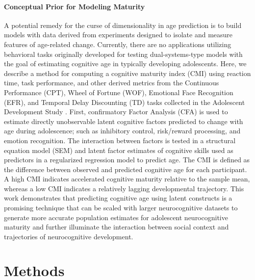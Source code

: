 \documentclass{article}%
\begin{document}
\paragraph*{Conceptual Prior for Modeling Maturity} A potential remedy for the curse of dimensionality in age prediction is to build models with data derived from experiments designed to isolate and measure features of age-related change. Currently, there are no applications utilizing behavioral tasks originally developed for testing dual-systems-type models with the goal of estimating cognitive age in typically developing adolescents. Here, we describe a method for computing a cognitive maturity index (CMI) using reaction time, task performance, and other derived metrics from the Continuous Performance (CPT), Wheel of Fortune (WOF), Emotional Face Recognition (EFR), and Temporal Delay Discounting (TD) tasks collected in the Adolescent Development Study \citep{Fishbein2016}. First, confirmatory Factor Analysis (CFA) is used to estimate directly unobservable latent cognitive factors predicted to change with age during adolescence; such as inhibitory control, risk/reward processing, and emotion recognition. The interaction between factors is tested in a structural equation model (SEM) and latent factor estimates of cognitive skills used as predictors in a regularized regression model to predict age. The CMI is defined as the difference between observed and predicted cognitive age for each participant. A high CMI indicates accelerated cognitive maturity relative to the sample mean, whereas a low CMI indicates a relatively lagging developmental trajectory. This work demonstrates that predicting cognitive age using latent constructs is a promising technique that can be scaled with larger neurocognitive datasets to  generate more accurate population estimates for adolescent neurocognitive maturity and further illuminate the interaction between social context and trajectories of neurocognitive development. 
\section*{Methods}
\end{document}
